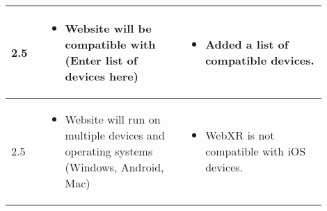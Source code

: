 \documentclass[onecolumn, draftclsnofoot,10pt, compsoc]{IEEEtran}
\begin{document}
\begin{longtable}{ |p{0.1\linewidth}|p{0.4\linewidth}|p{0.4\linewidth}| }
2.5
&
\begin{itemize}
    \item Website will be compatible with (Enter list of devices here)
\end{itemize}
&
\begin{itemize}
    \item Added a list of compatible devices.
\end{itemize} \\
\hline

2.5
&
\begin{itemize}
    \item Website will run on multiple devices and operating systems (Windows, Android, Mac)
\end{itemize}
&
\begin{itemize}
    \item WebXR is not compatible with iOS devices.
\end{itemize} \\
\hline

\end{longtable}


%


\end{document}
